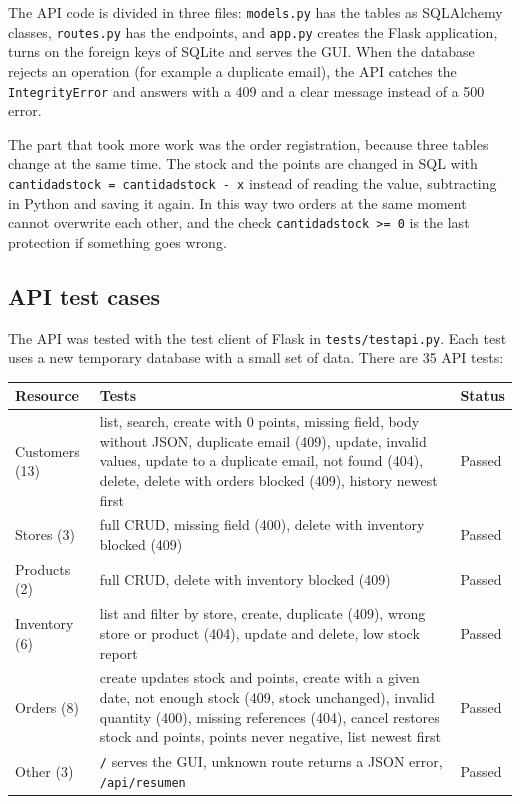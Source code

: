 \documentclass[11pt]{article}
\renewcommand{\_}{\oldus\allowbreak}
\begin{document}
The API code is divided in three files: \texttt{models.py} has the tables as SQLAlchemy classes,
\texttt{routes.py} has the endpoints, and \texttt{app.py} creates the Flask application, turns on
the foreign keys of SQLite and serves the GUI. When the database rejects an operation (for example
a duplicate email), the API catches the \texttt{IntegrityError} and answers with a 409 and a clear
message instead of a 500 error.

The part that took more work was the order registration, because three tables change at the same
time. The stock and the points are changed in SQL with \texttt{cantidad\_stock = cantidad\_stock - x}
instead of reading the value, subtracting in Python and saving it again. In this way two orders at
the same moment cannot overwrite each other, and the check \texttt{cantidad\_stock >= 0} is the last
protection if something goes wrong.

\subsection{API test cases}

The API was tested with the test client of Flask in \texttt{tests/test\_api.py}. Each test uses a
new temporary database with a small set of data. There are 35 API tests:

\begin{center}
\small
\begin{longtable}{p{3cm} p{10cm} p{1.4cm}}
\toprule
\textbf{Resource} & \textbf{Tests} & \textbf{Status} \\
\midrule
\endhead
Customers (13) & list, search, create with 0 points, missing field, body without JSON, duplicate email (409), update, invalid values, update to a duplicate email, not found (404), delete, delete with orders blocked (409), history newest first & Passed \\
Stores (3) & full CRUD, missing field (400), delete with inventory blocked (409) & Passed \\
Products (2) & full CRUD, delete with inventory blocked (409) & Passed \\
Inventory (6) & list and filter by store, create, duplicate (409), wrong store or product (404), update and delete, low stock report & Passed \\
Orders (8) & create updates stock and points, create with a given date, not enough stock (409, stock unchanged), invalid quantity (400), missing references (404), cancel restores stock and points, points never negative, list newest first & Passed \\
Other (3) & \texttt{/} serves the GUI, unknown route returns a JSON error, \texttt{/api/resumen} & Passed \\
\bottomrule
\end{longtable}
\end{center}
\end{document}
